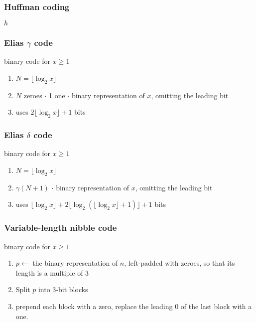 \begin{frame}[fragile]
\frametitle{Huffman coding}
\begin{algorithm}[H]
  \Return \(h\)\;
\end{algorithm}
\end{frame}


\begin{frame}[fragile]
\frametitle{Elias \(\gamma\) code}
\begin{block}{binary code for \(x\ge 1\)}
\begin{enumerate}
\item
      \(N= \lfloor \log_{2} x\rfloor\)
\item
      \(N\) zeroes \(\cdot\) 1 one  \(\cdot\) binary representation of \(x\),
      omitting the leading bit
\item
      uses \(2\lfloor \log_{2} x\rfloor + 1\) bits
\end{enumerate}
\end{block}
\end{frame}


\begin{frame}[fragile]
\frametitle{Elias \(\delta\) code}
\begin{block}{binary code for \(x\ge 1\)}
\begin{enumerate}
\item
      \(N= \lfloor \log_{2} x\rfloor\)
\item
      \(\gamma(N+1)\) \(\cdot\) binary representation of \(x\), omitting the
      leading bit
\item
      uses
      \(\lfloor \log_{2} x\rfloor + 2 \lfloor \log_{2} \left(\lfloor \log_{2} x\rfloor + 1 \right)\rfloor
      +1\) bits
\end{enumerate}
\end{block}
\end{frame}


\begin{frame}[fragile]
\frametitle{Variable-length nibble code}
\begin{block}{binary code for \(x\ge 1\)}
\begin{enumerate}
\item
      \(p \gets\) the binary representation of \(n\), left-padded with zeroes,
      so that its length is a multiple of 3
\item
      Split \(p\) into 3-bit blocks
\item
      prepend each block with a zero, replace the leading 0 of the last block with
      a one.
\end{enumerate}
\end{block}
\end{frame}


